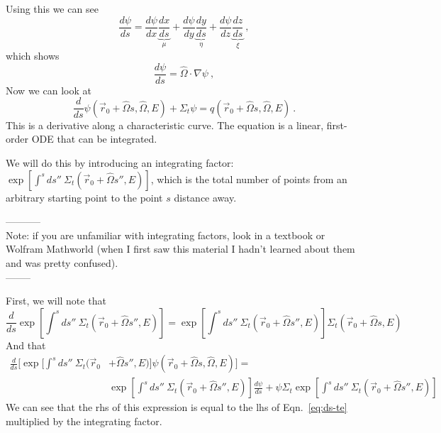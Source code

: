 \documentclass[12pt]{article}
\newcommand{\rvec}{\ensuremath{\vec{r}}}
\newcommand{\vOmega}{\ensuremath{\hat{\Omega}}}
\begin{document}
Using this we can see
\[\frac{d\psi}{ds} = \frac{d\psi}{dx}\underbrace{\frac{dx}{ds}}_{\mu} + \frac{d\psi}{dy}\underbrace{\frac{dy}{ds}}_{\eta} + \frac{d\psi}{dz}\underbrace{\frac{dz}{ds}}_{\xi}\:,\]
which shows 
\[\frac{d\psi}{ds} = \vOmega \cdot \nabla \psi\:,\]
Now we can look at
\begin{equation}
\frac{d}{ds}\psi(\rvec_0 + \vOmega s, \vOmega, E) + \Sigma_t \psi = q(\rvec_0 + \vOmega s, \vOmega, E)\:.
\label{eq:ds-te}
\end{equation}
This is a derivative along a characteristic curve. 
The equation is a linear, first-order ODE that can be integrated. 


We will do this by introducing an integrating factor: $\exp[\int^s ds'' \: \Sigma_t(\rvec_0 + \vOmega s'', E)]$, which is the total number of points from an arbitrary starting point to the point $s$ distance away.

-----------\\
Note: if you are unfamiliar with integrating factors, look in a textbook or Wolfram Mathworld (when I first saw this material I hadn't learned about them and was pretty confused). \\
--------

First, we will note that
\[\frac{d}{ds}\exp[\int^s ds'' \: \Sigma_t(\rvec_0 + \vOmega s'', E)] = \exp[\int^s ds'' \: \Sigma_t(\rvec_0 + \vOmega s'', E)] \Sigma_t(\rvec_0 + \vOmega s, E)\]
And that
\begin{align*}
\frac{d}{ds}\bigl[\exp[\int^s ds'' \: \Sigma_t(\rvec_0 &+ \vOmega s'', E)]\psi(\rvec_0 + \vOmega s, \vOmega, E)\bigr] =\\ &\exp[\int^s ds'' \: \Sigma_t(\rvec_0 + \vOmega s'', E)]\frac{d \psi}{ds} + \psi \Sigma_t \exp[\int^s ds'' \: \Sigma_t(\rvec_0 + \vOmega s'', E)]
\end{align*}
We can see that the rhs of this expression is equal to the lhs of Eqn.~\ref{eq:ds-te} multiplied by the integrating factor.
\end{document}
